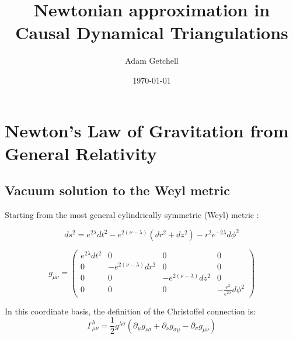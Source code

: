 \documentclass{article}
\title{Newtonian approximation in Causal Dynamical Triangulations}
\author{Adam Getchell}
\date{\today}
\begin{document}
\maketitle
\tableofcontents

\section{Newton's Law of Gravitation from General Relativity}

\subsection{Vacuum solution to the Weyl metric}

Starting from the most general cylindrically symmetric (Weyl) metric \cite{synge_relativity}:

\begin{equation}
ds^{2}=e^{2\lambda}dt^{2}-e^{2\left(\nu-\lambda\right)}\left(dr^{2}+dz^{2}\right)-r^{2}e^{-2\lambda}d\phi^{2}\label{eq:weyl-metric}
\end{equation}

\begin{equation}
g_{\mu\nu}=\left(\begin{array}{cccc}
e^{2\lambda}dt^{2} & 0 & 0 & 0\\
0 & -e^{2\left(\nu-\lambda\right)}dr^{2} & 0 & 0\\
0 & 0 & -e^{2\left(\nu-\lambda\right)}dz^{2} & 0\\
0 & 0 & 0 & -\frac{r^{2}}{e^{2\lambda}}d\phi^{2}
\end{array}\right)\label{eq:general-axisymmetric-static-matrix-metric}
\end{equation}

In this coordinate basis, the definition of the Christoffel connection is: \cite{carroll2003spacetime} 
\begin{equation}
\Gamma_{\mu\nu}^{\lambda}=\frac{1}{2}g^{\lambda\sigma}\left(\partial_{\mu}g_{\nu\sigma}+\partial_{\nu}g_{\sigma\mu}-\partial_{\sigma}g_{\mu\nu}\right)
\end{equation}
\end{document}
